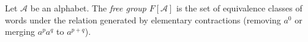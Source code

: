 Let $\mathcal{A}$ be an alphabet. The \textit{free group} $F[\mathcal{A}]$ is the set of equivalence classes of words under the relation generated by elementary contractions (removing $a^0$ or merging $a^p a^q$ to $a^{p+q}$).
